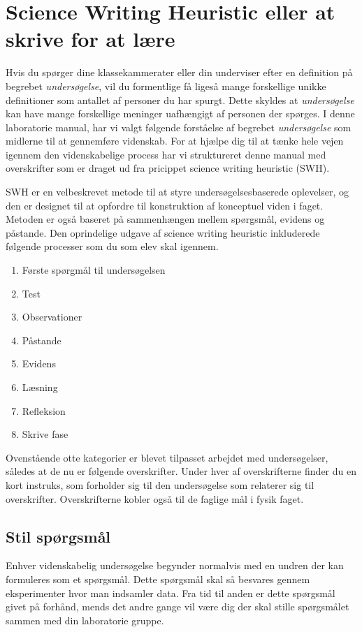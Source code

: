 
\chapter{Science Writing Heuristic eller at skrive for at lære}
 \label{app:A}
 
 Hvis du spørger dine klassekammerater eller din underviser efter en definition på begrebet \emph{undersøgelse}, vil du formentlige få ligeså mange forskellige unikke definitioner som antallet af personer du har spurgt. Dette skyldes at \emph{undersøgelse} kan have mange forskellige meninger uafhængigt af personen der spørges. I denne laboratorie manual, har vi valgt følgende forståelse af begrebet \emph{undersøgelse} som midlerne til at gennemføre videnskab. For at hjælpe dig til at tænke hele vejen igennem den videnskabelige process har vi struktureret denne manual med overskrifter som er draget ud fra pricippet science writing heuristic (SWH).
 
SWH er en velbeskrevet metode til at styre undersøgelsesbaserede oplevelser, og den er designet til at opfordre til konstruktion af konceptuel viden i faget. Metoden er også baseret på sammenhængen mellem spørgsmål, evidens og påstande. Den oprindelige udgave af science writing heuristic inkluderede følgende processer som du som elev skal igennem.
 
 \begin{enumerate}
 	\item Første spørgmål til undersøgelsen
 	\item Test
 	\item Observationer
 	\item Påstande
 	\item Evidens
 	\item Læsning
 	\item Refleksion
 	\item Skrive fase
\end{enumerate}

Ovenstående otte kategorier er blevet tilpasset arbejdet med undersøgelser, således at de nu er følgende overskrifter. Under hver af overskrifterne finder du en kort instruks, som forholder sig til den undersøgelse som relaterer sig til overskrifter. Overskrifterne kobler også til de faglige mål i fysik faget.

\section{Stil spørgsmål}
\label{sec:SS}
Enhver videnskabelig undersøgelse begynder normalvis med en undren der kan formuleres som et spørgsmål. Dette spørgsmål skal så besvares gennem eksperimenter hvor man indsamler data. Fra tid til anden er dette spørgsmål givet på forhånd, mends det andre gange vil være dig der skal stille spørgsmålet sammen med din laboratorie gruppe.

